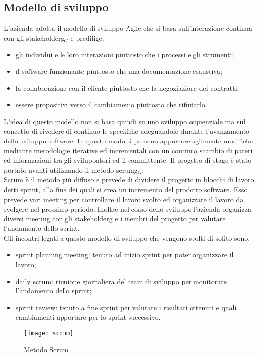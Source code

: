 \subsection{Modello di sviluppo}

L'azienda adotta il modello di sviluppo Agile che si basa sull'interazione continua con gli \gls{stakeholderg}$_G$ e predilige:
\begin{itemize}
	\item gli individui e le loro interazioni piuttosto che i processi e gli strumenti;
	\item il software funzionante piuttosto che una documentazione esaustiva;
	\item la collaborazione con il cliente piuttosto che la negoziazione dei contratti;
	\item essere propositivi verso il cambiamento piuttosto che rifiutarlo.
\end{itemize}
L'idea di questo modello non si basa quindi su uno sviluppo sequenziale ma sul concetto di rivedere di continuo le specifiche adeguandole durante l'avanzamento dello sviluppo software. In questo modo si possono apportare agilmente modifiche mediante metodologie iterative ed incrementali con un continuo scambio di pareri ed informazioni tra gli sviluppatori ed il committente. Il progetto di stage è stato portato avanti utilizzando il metodo \gls{scrumg}$_G$.\\
Scrum è il metodo più diffuso e prevede di dividere il progetto in blocchi di lavoro detti sprint, alla fine dei quali si crea un incremento del prodotto software. Esso prevede vari meeting per controllare il lavoro svolto ed organizzare il lavoro da svolgere nel prossimo periodo. Inoltre nel corso dello sviluppo l'azienda organizza diversi meeting con gli \gls{stakeholderg} e i membri del progetto per valutare l'andamento dello sprint.\\
Gli incontri legati a questo modello di sviluppo che vengono svolti di solito sono:
\begin{itemize}
	\item sprint planning meeting: tenuto ad inizio sprint per poter organizzare il lavoro;
	\item daily scrum: riunione giornaliera del team di sviluppo per monitorare l'andamento dello sprint;
	\item sprint review: tenuto a fine sprint per valutare i risultati ottenuti e quali cambiamenti apportare per lo sprint successivo.
\end{itemize}
\begin{figure}[H]
	\begin{center}
		\texttt{[image: scrum]}
		\caption{Metodo Scrum}
	\end{center}
\end{figure}
